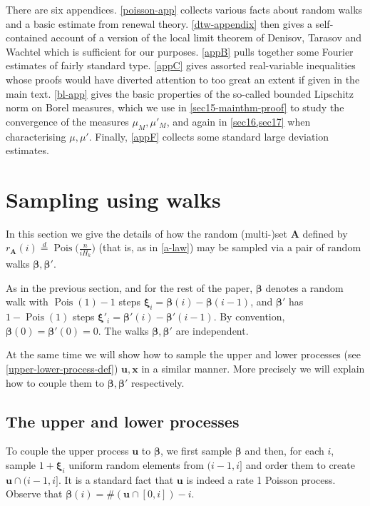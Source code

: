 \documentclass[11pt,reqno]{amsart}
\numberwithin{equation}{section}
\theoremstyle{definition}
\theoremstyle{remark}
\newcommand{\mbf}{\mathbf}
\newcommand\Pois{\operatorname{Pois}}
\def\boldbeta{\boldsymbol\beta}
\def\boldxi{\boldsymbol\xi}
\newcommand\samedist{\overset{d}{=}}
\begin{document}
There are six appendices. \cref{poisson-app} collects various facts about random walks and a basic estimate from renewal theory. \cref{dtw-appendix} then gives a self-contained account of a version of the local limit theorem of Denisov, Tarasov and Wachtel which is sufficient for our purposes. \cref{appB} pulls together some Fourier estimates of fairly standard type. \cref{appC} gives assorted real-variable inequalities whose proofs would have diverted attention to too great an extent if given in the main text. \cref{bl-app} gives the basic properties of the so-called bounded Lipschitz norm on Borel measures, which we use in \cref{sec15-mainthm-proof} to study the convergence of the measures $\mu_M,\mu'_M$, and again in \cref{sec16,sec17} when characterising $\mu, \mu'$. Finally, \cref{appF} collects some standard large deviation estimates.


\section{Sampling using walks }\label{section5}


In this section we give the details of how the random (multi-)set $\mbf{A}$ defined by $r_{\mbf{A}}(i) \samedist \Pois\big(\frac{n}{iH_k}\big)$ (that is, as in \cref{a-law}) may be sampled via a pair of random walks $\boldbeta, \boldbeta'$. 

As in the previous section, and for the rest of the paper, $\boldbeta$ denotes a random walk with $\Pois(1) - 1$ steps $\boldxi_i = \boldbeta(i) - \boldbeta(i-1)$, and $\boldbeta'$ has $1 - \Pois(1)$ steps $\boldxi'_i = \boldbeta'(i) - \boldbeta'(i-1)$. By convention, $\boldbeta(0) = \boldbeta'(0) = 0$. The walks $\boldbeta,\boldbeta'$ are independent.

At the same time we will show how to sample the upper and lower processes (see \cref{upper-lower-process-def}) $\mbf{u},\mbf{x}$ in a similar manner. More precisely we will explain how to couple them to $\boldbeta, \boldbeta'$ respectively.

\subsection{The upper and lower processes}
To couple the upper process $\mbf{u}$ to $\boldbeta$, we first sample $\boldbeta$ and then, for each $i$, sample $1 + \boldxi_i$ uniform random elements from $(i-1, i]$ and order them to create $\mbf{u} \cap (i-1,i]$. It is a standard fact that $\mbf{u}$ is indeed a rate 1 Poisson process. Observe that $\boldbeta(i) = \# (\mbf{u} \cap [0,i]) - i$.
\end{document}
